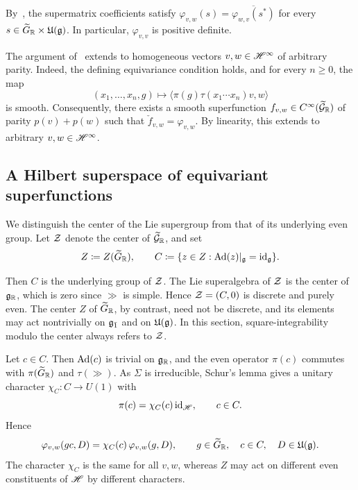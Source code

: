 By~\cite[Definition~6.8]{NeebSalmasian}, the supermatrix coefficients satisfy
$
\varphi_{v,w}(s)=\overline{\varphi_{w,v}(s^\ast)}
$
for every $s\in\widetilde{G}_{{\mathbb R}}\times{\mathfrak U}({\mathfrak{g}})$. In particular, $\varphi_{v,v}$ is positive definite.

The argument of~\cite[Proposition~6.9]{NeebSalmasian} extends to homogeneous vectors $v,w\in{\mathscr{H}}^\infty$ of arbitrary parity. Indeed, the defining equivariance condition holds, and for every $n\geq0$, the map
\begin{equation}
(x_1,\ldots,x_n,g)\longmapsto
\langle\pi(g)\tau(x_1\cdots x_n)v,w\rangle
\end{equation}
is smooth. Consequently, there exists a smooth superfunction $f_{v,w}\in C^\infty(\widetilde{{\mathcal{G}}}_{{\mathbb R}})$ of parity $p(v)+p(w)$ such that $\check f_{v,w}=\varphi_{v,w}$. By linearity, this extends to arbitrary $v,w\in{\mathscr{H}}^\infty$.





\subsection{A Hilbert superspace of equivariant superfunctions}

We distinguish the center of the Lie supergroup from that of its
underlying even group. Let ${\mathcal{Z}}$ denote the center of
$\widetilde{{\mathcal{G}}}_{{\mathbb R}}$, and set
\begin{equation}
Z\coloneqq Z(\widetilde{G}_{{\mathbb R}}),
\qquad
C\coloneqq
\{z\in Z:\operatorname{Ad}(z)|_{{\mathfrak{g}}}=\operatorname{id}_{{\mathfrak{g}}}\}.
\end{equation}

Then $C$ is the underlying group of ${\mathcal{Z}}$. The Lie superalgebra of ${\mathcal{Z}}$ is the center of ${\mathfrak{g}}_{{\mathbb R}}$, which is zero since $\gg$ is simple. Hence ${\mathcal{Z}}=(C,0)$ is discrete and purely even. The center $Z$ of $\widetilde{G}_{{\mathbb R}}$, by contrast, need not be discrete, and its elements may act nontrivially on ${\mathfrak{g}_{\bar{1}}}$ and on ${\mathfrak U}({\mathfrak{g}})$. In this section, square-integrability modulo the center always refers to ${\mathcal{Z}}$.

Let $c\in C$. Then $\operatorname{Ad}(c)$ is trivial on ${\mathfrak{g}}_{{\mathbb R}}$, and the even operator $\pi(c)$ commutes with $\pi(\widetilde{G}_{{\mathbb R}})$ and $\tau(\gg)$. As $\Sigma$ is irreducible, Schur's lemma gives a unitary character $\chi_C\colon C\to U(1)$ with
\begin{equation}
\pi(c)=\chi_C(c)\operatorname{id}_{{\mathscr{H}}},
\qquad c\in C.
\end{equation}
Hence
\begin{equation}\label{eq::C_equivariance}
\varphi_{v,w}(gc,D)=\chi_C(c)\,\varphi_{v,w}(g,D),
\qquad
g\in\widetilde{G}_{{\mathbb R}},\quad c\in C,\quad D\in{\mathfrak U}({\mathfrak{g}}).
\end{equation}
The character $\chi_C$ is the same for all $v,w$, whereas $Z$ may act on different even constituents of ${\mathscr{H}}$ by different characters.

